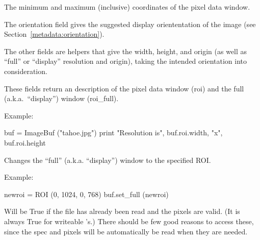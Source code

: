 The minimum and maximum (inclusive) coordinates of the pixel data window.
\apiend

The {\cf orientation} field gives the suggested display oriententation of
the image (see Section~\ref{metadata:orientation}).

The other fields are helpers that give the width, height, and origin
(as well as ``full'' or ``display'' resolution and origin), taking the
intended orientation into consideration.
\apiend

These fields return an \ROI description of the pixel data window
({\cf roi}) and the full (a.k.a.\ ``display'') window ({\cf roi_full}).

\noindent Example:
\begin{code}
    buf = ImageBuf ("tahoe.jpg")
    print "Resolution is", buf.roi.width, "x", buf.roi.height
\end{code}
\apiend

Changes the ``full'' (a.k.a. ``display'') window to the specified ROI.

\noindent Example:
\begin{code}
    newroi = ROI (0, 1024, 0, 768)
    buf.set_full (newroi)
\end{code}
\apiend

Will be {\cf True} if the file has already been read and the pixels are
valid. (It is always {\cf True} for writeable \ImageBuf's.)
There should be few good reasons to access these, since the spec and pixels
will be automatically be read when they are needed. 
\apiend

